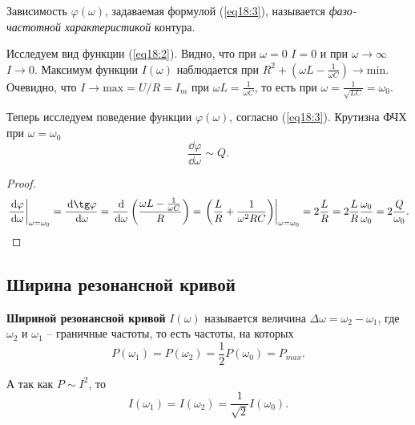         \begin{definition}
            Зависимость \( \varphi(\omega) \), задаваемая формулой
            (\ref{eq18:3}), называется \textit{фазо-частотной характеристикой}
            контура.
        \end{definition}

        Исследуем вид функции (\ref{eq18:2}). Видно, что при \( \omega = 0 \)
        \( I = 0 \) и при \( \omega \to \infty \) \( I \to 0 \). Максимум
        функции \( I(\omega) \) наблюдается при \( R^2 + \left(\omega L -
        \frac{1}{\omega C}\right) \to \mathrm{min} \). Очевидно, что
        \( I \to \mathrm{max} = U/R = I_m \) при \( \omega L =
        \frac{1}{\omega C} \), то есть при \( \omega = \frac{1}{\sqrt{LC}} =
        \omega_0 \).
        

        Теперь исследуем поведение функции \( \varphi(\omega) \), согласно
        (\ref{eq18:3}). Крутизна ФЧХ при \( \omega = \omega_0 \)
        \[
            \frac{\dd\varphi}{\dd\omega} \sim Q.
        \]
        
        \begin{proof}
            \[
                \left.\frac{\dd\varphi}{\dd\omega}\right|_{\omega = \omega_0} =
                \frac{\dd\tg\varphi}{\dd\omega} =
                \frac{\dd}{\dd\omega}\left(\frac{\omega L -
                \frac{1}{\omega C}}{R}\right) = 
                \left.\left(\frac{L}{R} + \frac{1}{\omega^2 RC}\right)
                \right|_{\omega = \omega_0} = 2\frac{L}{R} =
                2\frac{L}{R}\frac{\omega_0}{\omega_0} = 2\frac{Q}{\omega_0}.
            \]
        \end{proof}
    \subsection{Ширина резонансной кривой}
        \begin{definition}
            \textbf{Шириной резонансной кривой} \( I(\omega) \) называется
            величина \( \Delta\omega = \omega_2 - \omega_1 \), где
            \( \omega_2 \) и \( \omega_1 \) -- граничные частоты, то есть
            частоты, на которых
            \[
                P(\omega_1) = P(\omega_2) = \frac{1}{2}P(\omega_0) = P_{{max}}.
            \]
        \end{definition}
        А так как \( P \sim I^2 \), то
        \[
            I(\omega_1) = I(\omega_2) = \frac{1}{\sqrt{2}}I(\omega_0).
        \]
        
